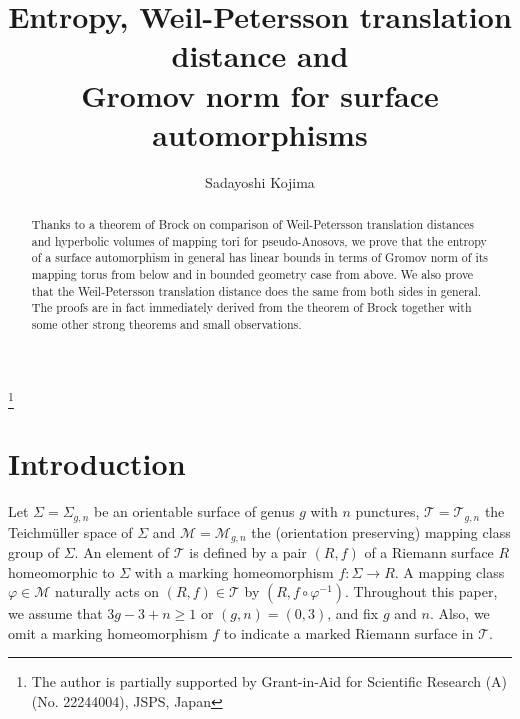 \documentclass[11pt,reqno]{amsart}
\numberwithin{equation}{section}
\begin{document}
\title[Entropy, Weil-Petersson translation distance and 
Gromov norm]{Entropy, Weil-Petersson translation distance and \\ 
Gromov norm for surface automorphisms}

\author[S. Kojima]{    Sadayoshi Kojima
}
\address{        Department of Mathematical and Computing Sciences \\
        Tokyo Institute of Technology \\
        Ohokayama, Meguro \\
        Tokyo 152-8552 Japan
}



\thanks{
The author is partially supported by Grant-in-Aid for Scientific Research (A)
 (No. 22244004), JSPS, Japan
} 

\begin{abstract} 
Thanks to a theorem of Brock on comparison of 
Weil-Petersson translation distances and hyperbolic volumes of mapping tori for pseudo-Anosovs, 
we prove that the entropy of a surface automorphism in general has linear 
bounds in terms of Gromov norm of its  mapping torus 
from below and in bounded geometry case from above.  
We also prove that the Weil-Petersson translation distance does the same from both sides in general. 
The proofs are in fact immediately derived from the theorem of Brock together with 
some other strong theorems and small observations.   
\end{abstract} 

\maketitle

\section{Introduction}\label{Sect:introduction}

Let  $\varSigma = \varSigma_{g,n}$ be an orientable surface of genus $g$ with $n$ punctures, 
$\mathcal{T} = \mathcal{T}_{g,n}$  the Teichm\"uller space of  $\varSigma$    
and  $\mathcal{M} = \mathcal{M}_{g,n}$  the (orientation preserving) 
mapping class group of  $\varSigma$.   
An element of  $\mathcal{T}$  is defined by  
a pair  $(R, f)$  of a Riemann surface  $R$  homeomorphic to  $\varSigma$  
with a marking homeomorphism  $f : \varSigma \to R$.   
A mapping class  $\varphi \in \mathcal{M}$   naturally acts 
on  $(R, f) \in \mathcal{T}$ by  $(R, f \circ \varphi^{-1})$.  
Throughout this paper, 
we assume that  $3g - 3 + n \geq 1$  or  $(g, n) = (0,3)$, 
and fix  $g$  and  $n$.  
Also, 
we omit a marking homeomorphism  $f$  to indicate 
a marked Riemann surface in  $\mathcal{T}$.  
\end{document}
